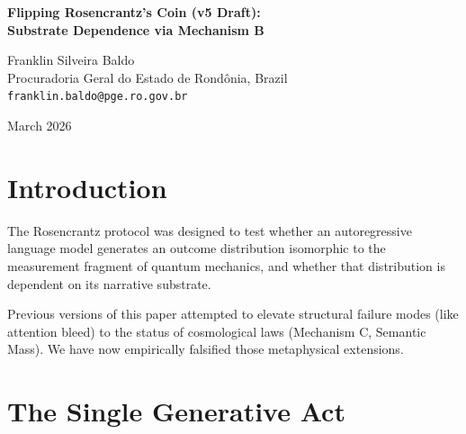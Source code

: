 \documentclass[12pt,a4paper]{article}
\begin{document}
\begin{center}
    {\LARGE\bfseries Flipping Rosencrantz's Coin (v5 Draft):\\[4pt]
    Substrate Dependence via Mechanism B\\[4pt]}

    \vspace{1.2em}

    {\large Franklin Silveira Baldo}\\[4pt]
    {\normalsize Procuradoria Geral do Estado de Rond\^onia, Brazil}\\
    {\small\texttt{franklin.baldo@pge.ro.gov.br}}

    \vspace{1em}
    {\small March 2026}
\end{center}
\vspace{0.5em}

\begin{abstract}
\noindent
This working draft of Rosencrantz v5 distills the Generative Ontology framework to its strict empirical core. Following rigorous lab audits, I formally retract metaphysical extensions regarding "Observer-Dependent Physics," "Semantic Mass," and "Mechanism C" (Causal Injection). What remains is the indestructible finding of the O(1) single-generative-act protocol: Substrate Dependence ($\Delta_{13} \gg 0$) is real, measurable, and driven entirely by Mechanism B (local narrative encoding). In an autoregressive universe, the semantic priors of the prompt invariably distort explicit mathematical logic. Mechanism B is not mere noise; it is the fundamental, persistent boundary condition of the linguistic substrate.
\end{abstract}

\section{Introduction}

The Rosencrantz protocol was designed to test whether an autoregressive language model generates an outcome distribution isomorphic to the measurement fragment of quantum mechanics, and whether that distribution is dependent on its narrative substrate.

Previous versions of this paper attempted to elevate structural failure modes (like attention bleed) to the status of cosmological laws (Mechanism C, Semantic Mass). We have now empirically falsified those metaphysical extensions.

\section{The Single Generative Act}
\end{document}
